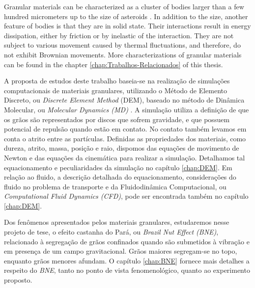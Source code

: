 
    Granular materials can be characterized as a cluster of bodies larger than a few hundred micrometers up to the size of asteroids \cite{Sands_Powders_and_Grains, The_Physics_of_Granular_Media}. In addition to the size, another feature of bodies is that they are in solid state. Their interactions result in energy dissipation, either by friction or by inelastic of the interaction. They are not subject to various movement caused by thermal fluctuations, and therefore, do not exhibit Brownian movements. More characterizations of granular materials can be found in the chapter \ref{chap:Trabalhos-Relacionados} of this thesis.

    A proposta de estudos deste trabalho baseia-se na realização de simulações computacionais de materiais granulares, utilizando o Método de Elemento Discreto, ou \textit{Discrete Element Method} (DEM), baseado no método de Dinâmica Molecular, ou \textit{Molecular Dynamics (MD)} \cite{Computer_Simulation_of_Liquids}. A simulação utiliza a definição de que os grãos são representados por discos  que sofrem gravidade, e que possuem potencial de repulsão quando estão em contato. No contato também levamos em conta o atrito entre as partículas. Definidas as propriedades dos materiais, como dureza, atrito, massa, posição e raio, dispomos das equações de movimento de Newton e das equações da cinemática para realizar a simulação. Detalhamos tal equacionamento e peculiaridades da simulação no capítulo \ref{chap:DEM}. Em relação ao fluido, a descrição detalhada do equacionamento, considerações do fluido no problema de transporte e da Fluidodinâmica Computacional, ou \textit{Computational Fluid Dynamics (CFD)}, pode ser encontrada também no capítulo \ref{chap:DEM}.



    Dos fenômenos apresentados pelos materiais granulares, estudaremos nesse projeto de tese, o efeito castanha do Pará, ou \textit{Brazil Nut Effect (BNE)}, relacionado à segregação de grãos confinados quando são submetidos à vibração e em presença de um campo gravitacional. Grãos maiores segregam-se no topo, enquanto grãos menores afundam. O capítulo \ref{chap:BNE} fornece mais detalhes a respeito do \textit{BNE}, tanto no ponto de vista fenomenológico, quanto ao experimento proposto.

